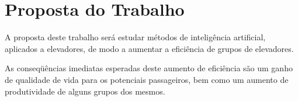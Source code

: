 \chapter{\label{chap:proposal}Proposta do Trabalho}

A proposta deste trabalho será estudar métodos de inteligência artificial,
aplicados a elevadores, de modo a aumentar a eficiência de grupos de elevadores.

As conseqüências imediatas esperadas deste aumento de eficiência são um ganho de
qualidade de vida para os potenciais passageiros, bem como um aumento de
produtividade de alguns grupos dos mesmos.